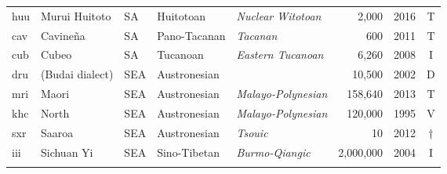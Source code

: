 \begin{table}
\begin{tabularx}{\textwidth}{lQlQQrlc}
 huu & {{Murui Huitoto}} &  SA & {Huitotoan} & {\textit{Nuclear Witotoan}} &  2,000 & 2016 & T\\
 cav & {{Cavineña}} &  SA & {Pano-Tacanan} & {\textit{Tacanan}} &  600 & 2011 & T\\
 cub & {{Cubeo}} &  SA & {Tucanoan} & {\textit{Eastern Tucanoan}} &  6,260 & 2008 & I\\
 dru & {{ (Budai dialect)}} &  SEA & {Austronesian} &  &  10,500 & 2002 & D\\
 mri & {{Maori}} &  SEA  & {Austronesian} & {\textit{Malayo-Polynesian}} &  158,640 & 2013 & T\\
 khc & {{ North}} &  SEA  & {Austronesian} & {\textit{Malayo-Polynesian}} &  120,000 & 1995 & V\\
 sxr & {{Saaroa}} &  SEA  & {Austronesian} & {\textit{Tsouic}} &  10 & 2012 & †\\
 iii & {{Sichuan Yi}} &  SEA & {Sino-Tibetan} & {\textit{Burmo-Qiangic}} &  2,000,000 & 2004 & I\\
 \lspbottomrule
\end{tabularx}
\end{table}


